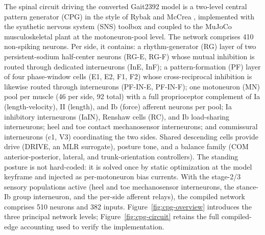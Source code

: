 The spinal circuit driving the converted Gait2392 model is a two-level
central pattern generator (CPG) in the style of Rybak and McCrea
\citep{rybak2006, mccrea2008}, implemented with the synthetic nervous
system (SNS) toolbox \citep{nourse2023} and coupled to the MuJoCo
musculoskeletal plant at the motoneuron-pool level. The network
comprises 410 non-spiking neurons. Per side, it contains: a
rhythm-generator (RG) layer of two persistent-sodium half-center
neurons (RG-E, RG-F) whose mutual inhibition is routed through dedicated
interneurons (InE, InF); a pattern-formation (PF) layer of four
phase-window cells (E1, E2, F1, F2) whose cross-reciprocal inhibition
is likewise routed through interneurons (PF-IN-E, PF-IN-F); one
motoneuron (MN) pool per muscle (46 per side, 92 total) with a full
proprioceptor complement of Ia (length-velocity), II (length), and Ib
(force) afferent neurons per pool; Ia inhibitory interneurons (IaIN),
Renshaw cells (RC), and Ib load-sharing interneurons; heel and toe
contact mechanosensor interneurons; and commissural interneurons (c1,
V3) coordinating the two sides. Shared descending cells provide drive
(DRIVE, an MLR surrogate), posture tone, and a balance family (COM
anterior-posterior, lateral, and trunk-orientation controllers). The
standing posture is not hard-coded: it is solved once by static
optimization at the model keyframe and injected as per-motoneuron bias
currents.
With the stage-2/3 sensory populations active (heel and toe
mechanosensor interneurons, the stance-Ib group interneuron, and the
per-side afferent relays), the compiled network comprises 510 neurons
and 382 inputs.
Figure~\ref{fig:cpg-overview} introduces the three principal
network levels; Figure~\ref{fig:cpg-circuit} retains the full compiled-edge
accounting used to verify the implementation.

